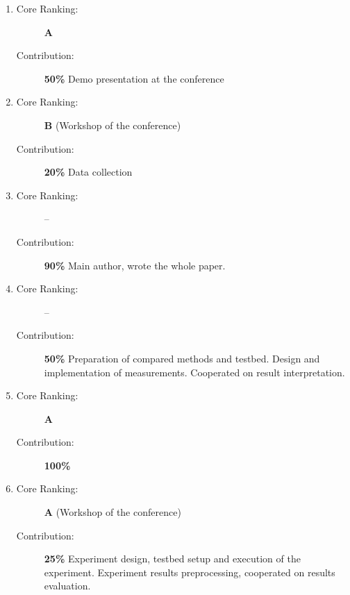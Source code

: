 \begin{enumerate}
  \item {}
  \begin{description}
    \item[Core Ranking:] \textbf{A}
    \item[Contribution:] \textbf{50\%} Demo presentation at the conference
  \end{description}
  
  \item {}
  \begin{description}
    \item[Core Ranking:] \textbf{B} (Workshop of the conference)
    \item[Contribution:] \textbf{20\%} Data collection
  \end{description}
  
  \item {}
  \begin{description}
    \item[Core Ranking:] --
    \item[Contribution:] \textbf{90\%} Main author, wrote the whole paper.
  \end{description}
  
  \item {}
  \begin{description}
    \item[Core Ranking:] --
    \item[Contribution:] \textbf{50\%} Preparation of compared methods and testbed. Design and implementation of measurements. Cooperated on result interpretation.
  \end{description}
  
  \item {}
  \begin{description}
    \item[Core Ranking:] \textbf{A}
    \item[Contribution:] \textbf{100\%}
  \end{description}
  
  \item {}
  \begin{description}
    \item[Core Ranking:] \textbf{A} (Workshop of the conference)
    \item[Contribution:] \textbf{25\%} Experiment design, testbed setup and execution of the experiment. Experiment results preprocessing, cooperated on results evaluation.
  \end{description}
  

\end{enumerate}
